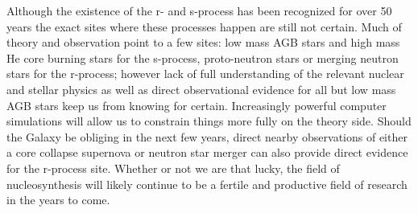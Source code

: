 Although the existence of the r- and s-process has been recognized for
over 50 years the exact sites where these processes happen are still
not certain. Much of theory and observation point to a few sites: low
mass AGB stars and high mass He core burning stars for the s-process,
proto-neutron stars or merging neutron stars for the r-process;
however lack of full understanding of the relevant nuclear and stellar
physics as well as direct observational evidence for all but low
mass AGB stars keep us from knowing for certain.  Increasingly
powerful computer simulations will allow us to constrain things more
fully on the theory side.  Should the Galaxy be obliging in the next
few years, direct nearby observations of either a core collapse
supernova or neutron star merger can also provide direct evidence for
the r-process site.  Whether or not we are that lucky, the field of
nucleosynthesis will likely continue to be a fertile and productive
field of research in the years to come.

